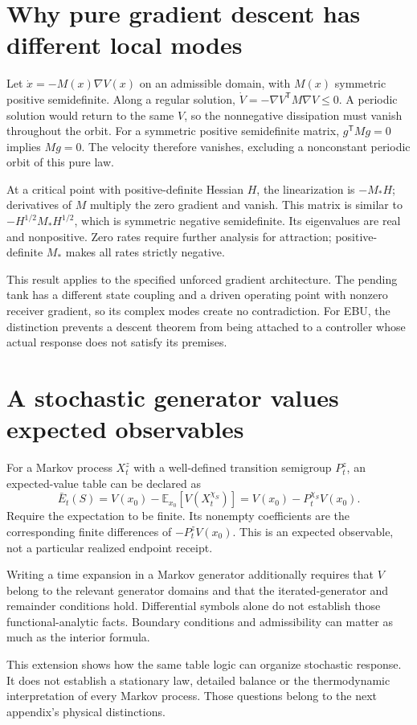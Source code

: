 \section{Why pure gradient descent has different local modes}
Let $\dot x=-M(x)\nabla V(x)$ on an admissible domain, with $M(x)$ symmetric positive semidefinite. Along a regular solution,
$\dot V=-\nabla V^{\mathsf T}M\nabla V\leq0$.
A periodic solution would return to the same $V$, so the nonnegative dissipation must vanish throughout the orbit. For a symmetric positive semidefinite matrix, $g^{\mathsf T}Mg=0$ implies $Mg=0$. The velocity therefore vanishes, excluding a nonconstant periodic orbit of this pure law.

At a critical point with positive-definite Hessian $H$, the linearization is $-M_*H$; derivatives of $M$ multiply the zero gradient and vanish. This matrix is similar to $-H^{1/2}M_*H^{1/2}$, which is symmetric negative semidefinite. Its eigenvalues are real and nonpositive. Zero rates require further analysis for attraction; positive-definite $M_*$ makes all rates strictly negative.

This result applies to the specified unforced gradient architecture. The pending tank has a different state coupling and a driven operating point with nonzero receiver gradient, so its complex modes create no contradiction. For EBU, the distinction prevents a descent theorem from being attached to a controller whose actual response does not satisfy its premises.

\section{A stochastic generator values expected observables}
For a Markov process $X_t^z$ with a well-defined transition semigroup $P_t^z$, an expected-value table can be declared as
\begin{equation}
 \bar E_t(S)=V(x_0)-\mathbb E_{x_0}[V(X_t^{\chi_S})]
            =V(x_0)-P_t^{\chi_S}V(x_0).
\end{equation}
Require the expectation to be finite. Its nonempty coefficients are the corresponding finite differences of $-P_t^zV(x_0)$. This is an expected observable, not a particular realized endpoint receipt.

Writing a time expansion in a Markov generator additionally requires that $V$ belong to the relevant generator domains and that the iterated-generator and remainder conditions hold. Differential symbols alone do not establish those functional-analytic facts. Boundary conditions and admissibility can matter as much as the interior formula.

This extension shows how the same table logic can organize stochastic response. It does not establish a stationary law, detailed balance or the thermodynamic interpretation of every Markov process. Those questions belong to the next appendix's physical distinctions.
